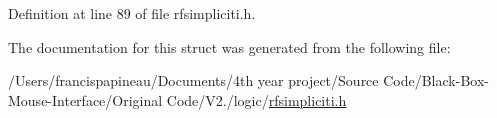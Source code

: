 \-Definition at line 89 of file rfsimpliciti.\-h.



\-The documentation for this struct was generated from the following file\-:\begin{DoxyCompactItemize}
\item 
/\-Users/francispapineau/\-Documents/4th year project/\-Source Code/\-Black-\/\-Box-\/\-Mouse-\/\-Interface/\-Original Code/\-V2./logic/\hyperlink{rfsimpliciti_8h}{rfsimpliciti.\-h}\end{DoxyCompactItemize}
